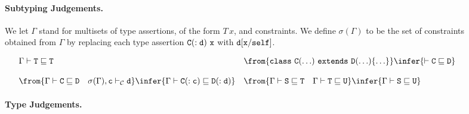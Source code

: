 \begin{figure*}
\paragraph{Subtyping Judgements.}
We let $\Gamma$ stand for multisets of type assertions, of the form
$T\,x$, and constraints. We define $\sigma(\Gamma)$ to be the set of
constraints obtained from $\Gamma$ by replacing each type assertion
${\tt C(:d)\ x}$ with ${\tt d}[{\tt x}/\mbox{\tt self}]$. 

$$
\begin{array}{ll}
\Gamma\vdash {\tt T} \subtype {\tt T}
&
\from{\class\ {\tt C(\ldots)}\ \extends\ {\tt D(\ldots)}\{\ldots\}}
\infer{\vdash {\tt C \subtype D}}
\\ & \\
\from{\Gamma \vdash {\tt C \subtype D} \ \ \ \sigma(\Gamma),{\tt c} \vdash_{\cal C} {\tt d}}
\infer{\Gamma \vdash {\tt C(:c) \subtype D(:d)}}
&
\from{\Gamma \vdash {\tt S \subtype T} \ \ \ \Gamma \vdash {\tt T \subtype U}}
\infer{\Gamma \vdash {\tt S \subtype U}}
\end{array}
$$

\paragraph{Type Judgements.}


\end{figure*}
